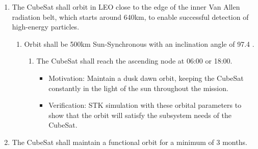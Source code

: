 \begin{enumerate}
\begin{enumerate}
\begin{enumerate}
\begin{itemize}
                    \item Motivation: The satellite will need to de-orbit whether or not communication is established in order to comply with safety standards.
                    \item Verification: A test will be conducted before launch where contact will be severed with the failsafe to determine if it will deploy.
                \end{itemize}
                \item The EoL system will be capable of activation in the event of a DoA scenario. 
                    \begin{itemize}
                        \item Motivation: The satellite will need to de-orbit even in the DoA scenario in order to comply with safety standards.
                        \item Verification: A test will be conducted before launch where all external energy sources, such as the battery,  will be severed from the failsafe to determine if it will deploy.
                    \end{itemize}
         \end{enumerate}
    \end{enumerate} %
    \item The CubeSat shall orbit in LEO close to the edge of the inner Van Allen radiation belt, which starts around 640km, to enable successful detection of high-energy particles.  
    \begin{enumerate}
        \item Orbit shall be 500km Sun-Synchronous with an inclination angle of 97.4 \degree.
        \begin{enumerate}
            \item The CubeSat shall reach the ascending node at 06:00 or 18:00.
                \begin{itemize}
                        \item Motivation: Maintain a dusk dawn orbit, keeping the CubeSat constantly in the light of the sun throughout the mission.
                        \item Verification: STK simulation with these orbital parameters to show that the orbit will satisfy the subsystem needs of the CubeSat. 
                    \end{itemize}
        \end{enumerate}
    \end{enumerate} %
    \item The CubeSat shall maintain a functional orbit for a minimum of 3 months.

\end{enumerate}
